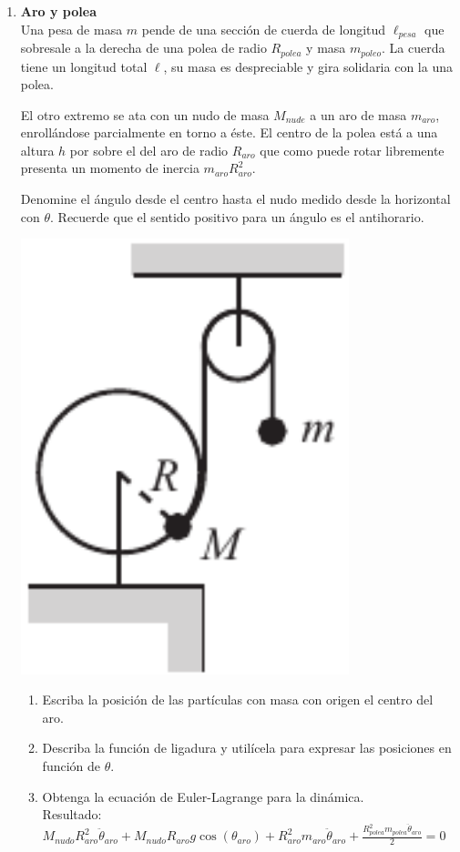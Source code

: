 \documentclass[11pt, spanish, a4paper, twoside]{article}
\begin{document}
\begin{enumerate}
\item 
	\begin{minipage}[t][3.5cm]{0.8\textwidth}
		\textbf{Aro y polea}\\
		Una pesa de masa \(m\) pende de una sección de cuerda de longitud \(\ell_{pesa}\) que sobresale a la derecha de una polea de radio \(R_{polea}\) y masa \(m_{poleo}\).
		La cuerda tiene un longitud total \(\ell\), su  masa es despreciable y gira solidaria con la una polea.

		El otro extremo se ata con un nudo de masa \(M_{nude}\) a un aro de masa \(m_{aro}\), enrollándose parcialmente en torno a éste.
		El centro de la polea está a una altura \(h\) por sobre el del aro de radio \(R_{aro}\) que como puede rotar libremente presenta un momento de inercia \(m_{aro} R_{aro}^2\).
		
		Denomine el ángulo desde el centro hasta el nudo medido desde la horizontal con \(\theta\).
		Recuerde que el sentido positivo para un ángulo es el antihorario. 
	\end{minipage}
	\begin{minipage}[c][0cm][t]{0.2\textwidth}
		\includegraphics[width=0.75\textwidth]{figures/cmchap6_fig6_14}
	\end{minipage}
	\begin{enumerate}
		\item Escriba la posición de las partículas con masa con origen el centro del aro.
		\item Describa la función de ligadura y utilícela para expresar las posiciones en función de \(\theta\).
		\item Obtenga la ecuación de Euler-Lagrange para la dinámica.\\
		Resultado:
		\(M_{nudo} R_{aro}^{2} \ddot{\theta}_{aro} + M_{nudo} R_{aro} g \cos{\left(\theta_{aro} \right)} + R_{aro}^{2} m_{aro} \ddot{\theta}_{aro} + \frac{R_{polea}^{2} m_{polea} \ddot{\theta}_{aro}}{2} = 0\)
	\end{enumerate}



\end{enumerate}
\end{document}
